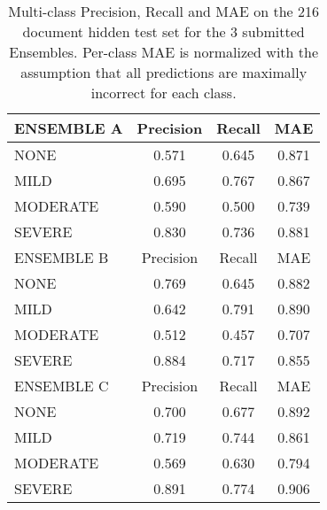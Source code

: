 \begin{table}
\centering
    \begin{tabular}{|l|c|c|c|}
        \hline
       \textsf{\cellcolor{gray!15} ENSEMBLE A} & \textsf{Precision} & \textsf{Recall} & \textsf{MAE} \\ 
       \hline
        \textsf{NONE} & 0.571 & 0.645 & \cellcolor{gray!15} 0.871 \\ 
        \textsf{MILD} & 0.695 & \cellcolor{gray!15} 0.767 & 0.867 \\ 
        \textsf{MODERATE} & 0.590 & 0.500 & 0.739 \\ 
        \textsf{SEVERE} & \cellcolor{gray!15} 0.830 & 0.736 & 0.881 \\ 
       \hline
       \textsf{\cellcolor{gray!15} ENSEMBLE B} & \textsf{Precision} & \textsf{Recall} & \textsf{MAE} \\ 
       \hline
        \textsf{NONE} & 0.769 & 0.645 & 0.882 \\ 
        \textsf{MILD} & 0.642 & \cellcolor{gray!15} 0.791 & \cellcolor{gray!15} 0.890 \\ 
        \textsf{MODERATE} & 0.512 & 0.457 & 0.707 \\ 
        \textsf{SEVERE} & \cellcolor{gray!15} 0.884 & 0.717 & 0.855 \\ 
       \hline
       \textsf{\cellcolor{gray!15} ENSEMBLE C} & \textsf{Precision} & \textsf{Recall} & \textsf{MAE} \\ 
       \hline
        \textsf{NONE} & 0.700 & 0.677 & 0.892 \\ 
        \textsf{MILD} & 0.719 & 0.744 & 0.861 \\ 
        \textsf{MODERATE} & 0.569 & 0.630 & 0.794 \\ 
        \textsf{SEVERE} & \cellcolor{gray!15} 0.891 & \cellcolor{gray!15} 0.774 & \cellcolor{gray!15} 0.906 \\ 
       \hline
    \end{tabular}
    \caption{Multi-class Precision, Recall and MAE on the 216 document hidden test set for the 3 submitted Ensembles. Per-class MAE is normalized with the assumption that all predictions are maximally incorrect for each class.}
    \label{tab:EnsembleTestMetrics}
\end{table}




